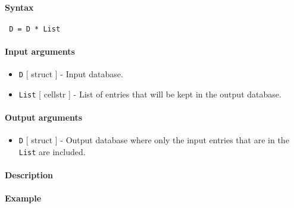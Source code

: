 


	\paragraph{Syntax}
 
 \begin{verbatim}
 D = D * List
 \end{verbatim}
 
 \paragraph{Input arguments}
 
 \begin{itemize}
 \item
   \texttt{D} {[} struct {]} - Input database.
 \item
   \texttt{List} {[} cellstr {]} - List of entries that will be kept in
   the output database.
 \end{itemize}
 
 \paragraph{Output arguments}
 
 \begin{itemize}
 \item
   \texttt{D} {[} struct {]} - Output database where only the input
   entries that are in the \texttt{List} are included.
 \end{itemize}
 
 \paragraph{Description}
 
 \paragraph{Example}


